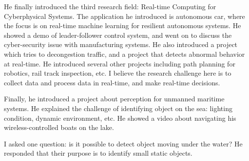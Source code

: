 \documentclass[11pt, oneside]{article}   	%
\begin{document}
He finally introduced the third research field: Real-time Computing for Cyberphysical Systems. The application he introduced is autonomous car, where the focus is on real-time machine learning for resilient autonomous systems. He showed a demo of leader-follower control system, and went on to discuss the cyber-security issue with manufacturing systems. He also introduced a project which tries to decongestion traffic, and a project that detects abnormal behavior at real-time. He introduced several other projects including path planning for robotics, rail track inspection, etc. I believe the research challenge here is to collect data and process data in real-time, and make real-time decisions. 

Finally, he introduced a project about perception for unmanned maritime systems. He explained the challenge of identifying object on the sea: lighting condition, dynamic environment, etc. He showed a video about navigating his wireless-controlled boats on the lake. 

I asked one question: is it possible to detect object moving under the water? He responded that their purpose is to identify small static objects.
\end{document}
